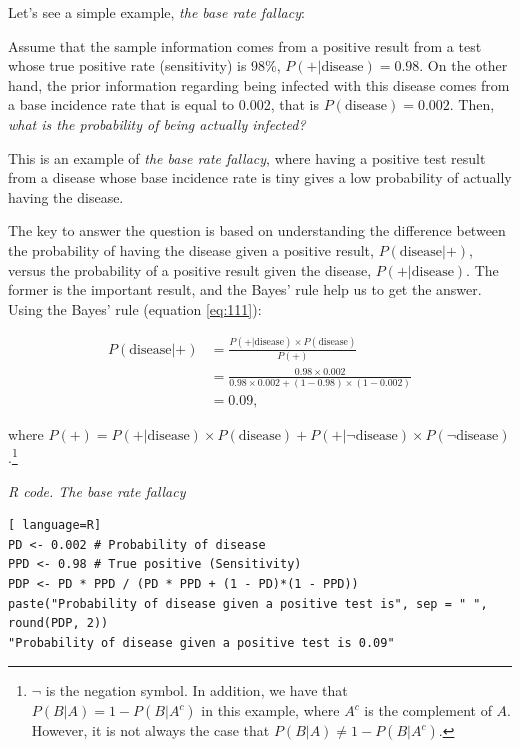 Let's see a simple example, \textit{the base rate fallacy}:

Assume that the sample information comes from a positive result from a test whose true positive rate (sensitivity) is 98\%, $P(+|\text{disease})=0.98$. On the other hand, the prior information regarding being infected with this disease comes from a base incidence rate that is equal to 0.002, that is $P(\text{disease})=0.002$. Then, \textit{what is the probability of being actually infected?}

This is an example of \textit{the base rate fallacy}, where having a positive test result from a disease whose base incidence rate is tiny gives a low probability of actually having the disease.

The key to answer the question is based on understanding the difference between the probability of having the disease given a positive result, $P(\text{disease}|+)$, versus the probability of a positive result given the disease, $P(+|\text{disease})$. The former is the important result, and the Bayes' rule help us to get the answer. Using the Bayes' rule (equation \ref{eq:111}):

\begin{align*}
	P(\text{disease}|+) & = \frac{P(+|\text{disease})\times P(\text{disease})}{P(+)}\\
	& = \frac{0.98 \times 0.002}{0.98 \times 0.002 + (1-0.98) \times (1-0.002)}\\
	& =0.09, 
\end{align*}

where $P(+)=P(+|\text{disease})\times P(\text{disease})+P(+|\lnot\text{disease})\times P( \lnot\text{disease})$.\footnote{$\lnot$ is the negation symbol. In addition, we have that $P(B|A)=1-P(B|A^c)$ in this example, where $A^c$ is the complement of $A$. However, it is not always the case that $P(B|A)\neq 1-P(B|A^c)$.}

\begin{tcolorbox}[enhanced,width=4.67in,center upper,
	fontupper=\large\bfseries,drop shadow southwest,sharp corners]
\textit{R code. The base rate fallacy}
\begin{VF}
\begin{lstlisting}[ language=R]
PD <- 0.002 # Probability of disease
PPD <- 0.98 # True positive (Sensitivity)
PDP <- PD * PPD / (PD * PPD + (1 - PD)*(1 - PPD))
paste("Probability of disease given a positive test is", sep = " ", round(PDP, 2))
"Probability of disease given a positive test is 0.09"
\end{lstlisting}
\end{VF}
\end{tcolorbox}

